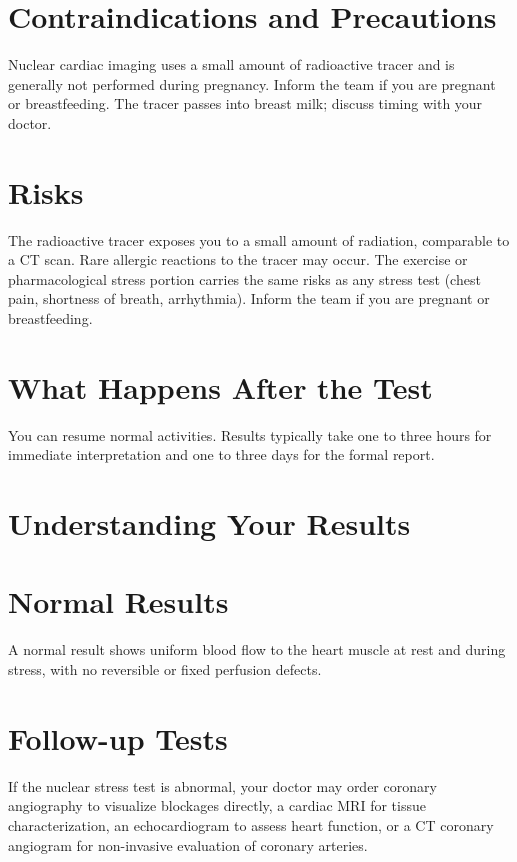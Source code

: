 \section*{Contraindications and Precautions}
Nuclear cardiac imaging uses a small amount of radioactive tracer and is generally not performed during pregnancy. Inform the team if you are pregnant or breastfeeding. The tracer passes into breast milk; discuss timing with your doctor.

\section*{Risks}
The radioactive tracer exposes you to a small amount of radiation, comparable to a CT scan. Rare allergic reactions to the tracer may occur. The exercise or pharmacological stress portion carries the same risks as any stress test (chest pain, shortness of breath, arrhythmia). Inform the team if you are pregnant or breastfeeding.

\section*{What Happens After the Test}
You can resume normal activities. Results typically take one to three hours for immediate interpretation and one to three days for the formal report.

\section*{Understanding Your Results}

\section*{Normal Results}
A normal result shows uniform blood flow to the heart muscle at rest and during stress, with no reversible or fixed perfusion defects.

\section*{Follow-up Tests}
If the nuclear stress test is abnormal, your doctor may order coronary angiography to visualize blockages directly, a cardiac MRI for tissue characterization, an echocardiogram to assess heart function, or a CT coronary angiogram for non-invasive evaluation of coronary arteries.
\clearpage

